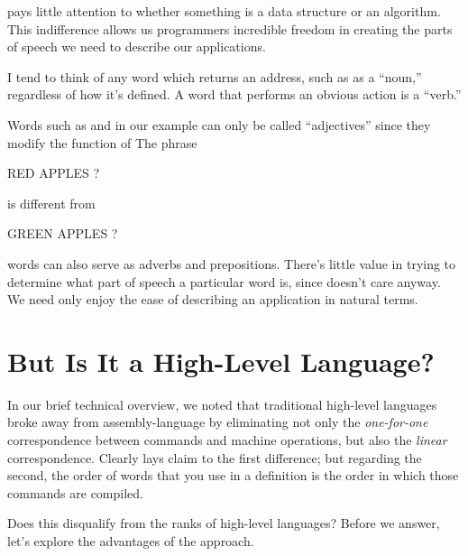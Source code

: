 \Forth{} pays little attention to whether something is a data structure
or an algorithm. This indifference allows us programmers incredible
freedom in creating the parts of speech we need to describe our
applications.

I tend to think of any word which returns an address, such as
 as a ``noun,'' regardless of how it's defined. A word
that performs an obvious action is a ``verb.''

Words such as  and  in our example can only be
called ``adjectives'' since they modify the function of
 The phrase

\begin{Code}
RED APPLES ?
\end{Code}
is different from

\begin{Code}
GREEN APPLES ?
\end{Code}
\Forth{} words can also serve as adverbs and prepositions. There's little
value in trying to determine what part of speech a particular word is,
since \Forth{} doesn't care anyway. We need only enjoy the ease of
describing an application in natural terms.%
\label{apples2}%


\section{But Is It a High-Level Language?}%
%
In our brief technical overview, we noted that traditional high-level
languages broke away from assembly-language by eliminating not only
the \emph{one-for-one} correspondence between commands and machine
operations, but also the \emph{linear} correspondence. Clearly \Forth{}
lays claim to the first difference; but regarding the second, the
order of words that you use in a definition is the order in which
those commands are compiled.

Does this disqualify \Forth{} from the ranks of high-level languages?
Before we answer, let's explore the advantages of the \Forth{} approach.


